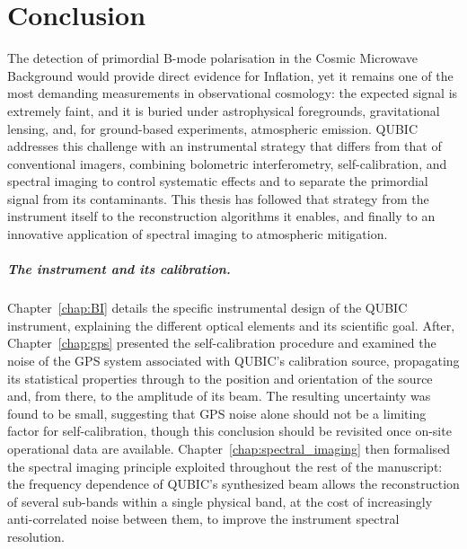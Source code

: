 \documentclass[../../thesis.tex]{subfiles}
\begin{document}
\chapter*{Conclusion}
\fancyhead{}

The detection of primordial B-mode polarisation in the Cosmic Microwave Background would provide direct evidence for Inflation, yet it remains one of the most demanding measurements in observational cosmology: the expected signal is extremely faint, and it is buried under astrophysical foregrounds, gravitational lensing, and, for ground-based experiments, atmospheric emission. QUBIC addresses this challenge with an instrumental strategy that differs from that of conventional imagers, combining bolometric interferometry, self-calibration, and spectral imaging to control systematic effects and to separate the primordial signal from its contaminants. This thesis has followed that strategy from the instrument itself to the reconstruction algorithms it enables, and finally to an innovative application of spectral imaging to atmospheric mitigation.

\paragraph{The instrument and its calibration.}
Chapter~\ref{chap:BI} details the specific instrumental design of the QUBIC instrument, explaining the different optical elements and its scientific goal. After, Chapter~\ref{chap:gps} presented the self-calibration procedure and examined the noise of the GPS system associated with QUBIC's calibration source, propagating its statistical properties through to the position and orientation of the source and, from there, to the amplitude of its beam. The resulting uncertainty was found to be small, suggesting that GPS noise alone should not be a limiting factor for self-calibration, though this conclusion should be revisited once on-site operational data are available. Chapter~\ref{chap:spectral_imaging} then formalised the spectral imaging principle exploited throughout the rest of the manuscript: the frequency dependence of QUBIC's synthesized beam allows the reconstruction of several sub-bands within a single physical band, at the cost of increasingly anti-correlated noise between them, to improve the instrument spectral resolution.
\end{document}
